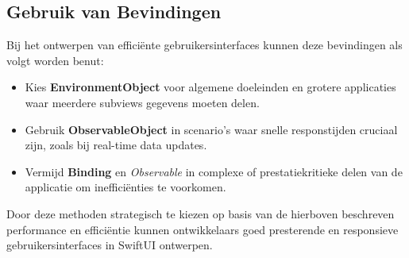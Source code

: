 \subsection{Gebruik van Bevindingen}
Bij het ontwerpen van efficiënte gebruikersinterfaces kunnen deze bevindingen als volgt worden benut:
\begin{itemize}
    \item Kies \textbf{EnvironmentObject} voor algemene doeleinden en grotere applicaties waar meerdere subviews gegevens moeten delen.
    \item Gebruik \textbf{ObservableObject} in scenario's waar snelle responstijden cruciaal zijn, zoals bij real-time data updates.
    \item Vermijd \textbf{Binding} en \textit{Observable} in complexe of prestatiekritieke delen van de applicatie om inefficiënties te voorkomen.
\end{itemize}

Door deze methoden strategisch te kiezen op basis van de hierboven beschreven performance en efficiëntie kunnen ontwikkelaars goed presterende en responsieve gebruikersinterfaces in SwiftUI ontwerpen.



